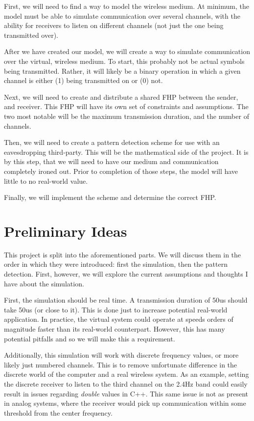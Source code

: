 \documentclass[conference]{IEEEtran}
\begin{document}
First, we will need to find a way to model the wireless medium.
At minimum, the model must be able to simulate communication over several channels, with the ability for receivers to listen on different channels (not just the one being transmitted over).

After we have created our model, we will create a way to simulate communication over the virtual, wireless medium.
To start, this probably not be actual symbols being transmitted.
Rather, it will likely be a binary operation in which a given channel is either (1) being transmitted on or (0) not.

Next, we will need to create and distribute a shared FHP between the sender, and receiver.
This FHP will have its own set of constraints and assumptions.
The two most notable will be the maximum transmission duration, and the number of channels.

Then, we will need to create a pattern detection scheme for use with an eavesdropping third-party.
This will be the mathematical side of the project.
It is by this step, that we will need to have our medium and communication completely ironed out.
Prior to completion of those steps, the model will have little to no real-world value.

Finally, we will implement the scheme and determine the correct FHP.

\section{Preliminary Ideas}
This project is split into the aforementioned parts.
We will discuss them in the order in which they were introduced: first the simulation, then the pattern detection.
First, however, we will explore the current assumptions and thoughts I have about the simulation.

First, the simulation should be real time.
A transmission duration of 50us should take 50us (or close to it).
This is done just to increase potential real-world application.
In practice, the virtual system could operate at speeds orders of magnitude faster than its real-world counterpart.
However, this has many potential pitfalls and so we will make this a requirement.

Additionally, this simulation will work with discrete frequency values, or more likely just numbered channels.
This is to remove unfortunate difference in the discrete world of the computer and a real wireless system.
As an example, setting the discrete receiver to listen to the third channel on the 2.4Hz band could easily result in issues regarding \textit{double} values in C++.
This same issue is not as present in analog systems, where the receiver would pick up communication within some threshold from the center frequency.
\end{document}
